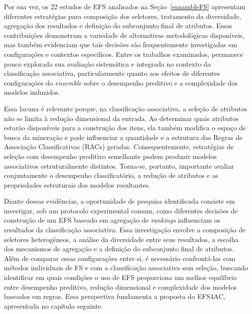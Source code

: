 Por sua vez, os 22 estudos de EFS analisados na Seção~\ref{ensambleFS} apresentam diferentes estratégias para composição dos seletores, tratamento da diversidade, agregação dos resultados e definição do subconjunto final de atributos. Essas contribuições demonstram a variedade de alternativas metodológicas disponíveis, mas também evidenciam que tais decisões são frequentemente investigadas em configurações e contextos específicos. Entre os trabalhos examinados, permanece pouco explorada sua avaliação sistemática e integrada no contexto da classificação associativa, particularmente quanto aos efeitos de diferentes configurações do \textit{ensemble} sobre o desempenho preditivo e a complexidade dos modelos induzidos.

Essa lacuna é relevante porque, na classificação associativa, a seleção de atributos não se limita à redução dimensional da entrada. Ao determinar quais atributos estarão disponíveis para a construção dos itens, ela também modifica o espaço de busca da mineração e pode influenciar a quantidade e a estrutura das Regras de Associação Classificativas (RACs) geradas. Consequentemente, estratégias de seleção com desempenho preditivo semelhante podem produzir modelos associativos estruturalmente distintos. Torna-se, portanto, importante avaliar conjuntamente o desempenho classificatório, a redução de atributos e as propriedades estruturais dos modelos resultantes.

Diante dessas evidências, a oportunidade de pesquisa identificada consiste em investigar, sob um protocolo experimental comum, como diferentes decisões de construção de um EFS baseado em agregação de \textit{rankings} influenciam os resultados da classificação associativa. Essa investigação envolve a composição de seletores heterogêneos, a análise da diversidade entre seus resultados, a escolha dos mecanismos de agregação e a definição do subconjunto final de atributos. Além de comparar essas configurações entre si, é necessário confrontá-las com métodos individuais de FS e com a classificação associativa sem seleção, buscando identificar em quais condições o uso de EFS proporciona um melhor equilíbrio entre desempenho preditivo, redução dimensional e complexidade dos modelos baseados em regras. Essa perspectiva fundamenta a proposta do EFS4AC, apresentada no capítulo seguinte.
